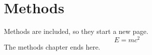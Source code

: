 \chapter{Methods}
Methods are included, so they start a new page.
\begin{equation}
  E = mc^2
\end{equation}
The methods chapter ends here.
